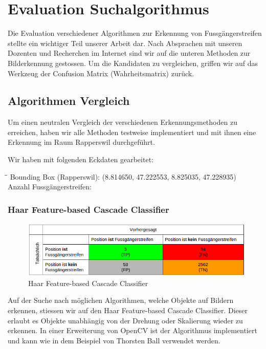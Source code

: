 \section{Evaluation Suchalgorithmus}
\label{sec:suchalgorithmus}
Die Evaluation verschiedener Algorithmen zur Erkennung von Fussgängerstreifen stellte ein wichtiger Teil unserer Arbeit dar. Nach Absprachen mit unseren Dozenten und Recherchen im Internet sind wir auf die unteren Methoden zur Bilderkennung gestossen. Um die Kandidaten zu vergleichen, griffen wir auf das Werkzeug der \Gls{Confusion Matrix} (Wahrheitsmatrix) zurück.

\subsection{Algorithmen Vergleich}
Um einen neutralen Vergleich der verschiedenen Erkennungsmethoden zu erreichen, haben wir alle Methoden testweise implementiert und mit ihnen eine Erkennung im Raum Rapperswil durchgeführt.

Wir haben mit folgenden Eckdaten gearbeitet:
\begin{tabbing}[H]
    \hspace*{5cm}\=\hspace*{6cm}\= \kill
    Bounding Box (Rapperswil): \> (8.814650, 47.222553, 8.825035, 47.228935) \\
    Anzahl Fussgängerstreifen:  \\
\end{tabbing}


\subsubsection{\Gls{Haar Feature-based Cascade Classifier}}
\begin{figure}[H]
\includegraphics[width=\textwidth]{images/haar_conf.png}
\caption[Haar Feature-based Cascade Classifier]{Haar Feature-based Cascade Classifier}
\end{figure}
Auf der Suche nach möglichen Algorithmen, welche Objekte auf Bildern erkennen, stiessen wir auf den Haar Feature-based Cascade Classifier. Dieser erlaubt es Objekte unabhängig von der Drehung oder Skalierung wieder zu erkennen. In einer Erweiterung von OpenCV ist der Algorithmus implementiert und kann wie in dem Beispiel \cite{OpencvHaar} von Thorsten Ball  verwendet werden.

